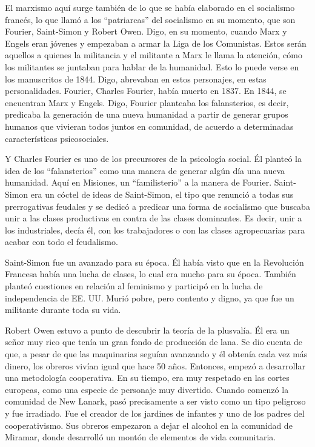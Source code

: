 \documentclass[
  jou,
  floatsintext,
  longtable,
  a4paper,
  nolmodern,
  notxfonts,
  notimes,
  12pt,
  colorlinks=true,linkcolor=blue,citecolor=blue,urlcolor=blue]{apa7}
\begin{document}
El marxismo aquí surge también de lo que se había elaborado en el
socialismo francés, lo que llamó a los ``patriarcas'' del socialismo en
su momento, que son Fourier, Saint-Simon y Robert Owen. Digo, en su
momento, cuando Marx y Engels eran jóvenes y empezaban a armar la Liga
de los Comunistas. Estos serán aquellos a quienes la militancia y el
militante a Marx le llama la atención, cómo los militantes se juntaban
para hablar de la humanidad. Esto lo puede verse en los manuscritos de
1844. Digo, abrevaban en estos personajes, en estas personalidades.
Fourier, Charles Fourier, había muerto en 1837. En 1844, se encuentran
Marx y Engels. Digo, Fourier planteaba los falansterios, es decir,
predicaba la generación de una nueva humanidad a partir de generar
grupos humanos que vivieran todos juntos en comunidad, de acuerdo a
determinadas características psicosociales.

Y Charles Fourier es uno de los precursores de la psicología social. Él
planteó la idea de los ``falansterios'' como una manera de generar algún
día una nueva humanidad. Aquí en Misiones, un ``familisterio'' a la
manera de Fourier. Saint-Simon era un cóctel de ideas de Saint-Simon, el
tipo que renunció a todas sus prerrogativas feudales y se dedicó a
predicar una forma de socialismo que buscaba unir a las clases
productivas en contra de las clases dominantes. Es decir, unir a los
industriales, decía él, con los trabajadores o con las clases
agropecuarias para acabar con todo el feudalismo.

Saint-Simon fue un avanzado para su época. Él había visto que en la
Revolución Francesa había una lucha de clases, lo cual era mucho para su
época. También planteó cuestiones en relación al feminismo y participó
en la lucha de independencia de EE. UU. Murió pobre, pero contento y
digno, ya que fue un militante durante toda su vida.

Robert Owen estuvo a punto de descubrir la teoría de la plusvalía. Él
era un señor muy rico que tenía un gran fondo de producción de lana. Se
dio cuenta de que, a pesar de que las maquinarias seguían avanzando y él
obtenía cada vez más dinero, los obreros vivían igual que hace 50 años.
Entonces, empezó a desarrollar una metodología cooperativa. En su
tiempo, era muy respetado en las cortes europeas, como una especie de
personaje muy divertido. Cuando comenzó la comunidad de New Lanark, pasó
precisamente a ser visto como un tipo peligroso y fue irradiado. Fue el
creador de los jardines de infantes y uno de los padres del
cooperativismo. Sus obreros empezaron a dejar el alcohol en la comunidad
de Miramar, donde desarrolló un montón de elementos de vida comunitaria.
\end{document}
